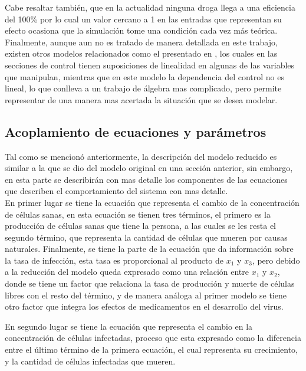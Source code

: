 \documentclass{article}
\begin{document}
    Cabe resaltar también, que en la actualidad ninguna droga llega a una
    eficiencia del 100\% por lo cual un valor cercano a 1 en las entradas que
    representan su efecto ocasiona que la simulación tome una condición cada vez
    más teórica.\cite{model}\\

    Finalmente, aunque aun no es tratado de manera detallada en este trabajo,
    existen otros modelos relacionados como el presentado en \cite{ieee4},
    los cuales en las secciones de control tienen suposiciones de linealidad en
    algunas de las variables que manipulan, mientras que en este modelo la
    dependencia del control no es lineal, lo que conlleva a un trabajo de álgebra
    mas complicado, pero permite representar de una manera mas acertada la
    situación que se desea modelar.\\

    \subsection{Acoplamiento de ecuaciones y parámetros}

    Tal como se mencionó anteriormente, la descripción del modelo reducido es
    similar a la que se dio del modelo original en una sección anterior, sin
    embargo, en esta parte se describirán con mas detalle los componentes de las
    ecuaciones que describen el comportamiento del sistema con mas detalle.\\

    En primer lugar se tiene la ecuación que representa el cambio de la
    concentración de células sanas, en esta ecuación se tienen tres términos,
    el primero es la producción de células sanas que tiene la persona, a las
    cuales se les resta el segundo término, que representa la cantidad de
    células que mueren por causas naturales. Finalmente, se tiene la parte de la
    ecuación que da información sobre la tasa de infección, esta tasa es
    proporcional al producto de $x_1$ y $x_3$, pero debido a la reducción del
    modelo queda expresado como una relación entre $x_1$ y $x_2$, donde se
    tiene un factor que relaciona la tasa de producción y muerte de células
    libres con el resto del término, y de manera análoga al primer modelo se
    tiene otro factor que integra los efectos de medicamentos en el desarrollo
    del virus.

    En segundo lugar se tiene la ecuación que representa el cambio en la concentración
    de células infectadas, proceso que esta expresado como la diferencia entre el
    último término de la primera ecuación, el cual representa su crecimiento, y
    la cantidad de células infectadas que mueren.
\end{document}
